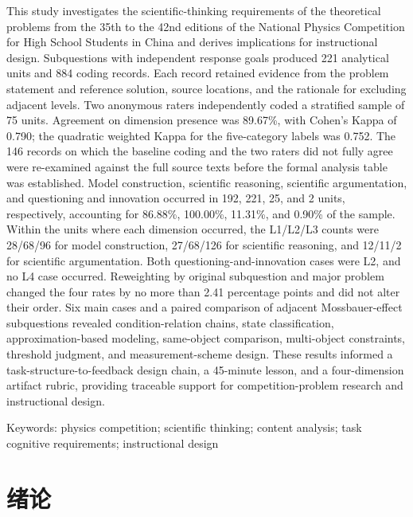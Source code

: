 \documentclass[
  12pt,
  a4paper,twoside,openany]{ctexbook}
\begin{document}
This study investigates the scientific-thinking requirements of the
theoretical problems from the 35th to the 42nd editions of the National
Physics Competition for High School Students in China and derives
implications for instructional design. Subquestions with independent
response goals produced 221 analytical units and 884 coding records.
Each record retained evidence from the problem statement and reference
solution, source locations, and the rationale for excluding adjacent
levels. Two anonymous raters independently coded a stratified sample of
75 units. Agreement on dimension presence was 89.67\%, with Cohen's
Kappa of 0.790; the quadratic weighted Kappa for the five-category
labels was 0.752. The 146 records on which the baseline coding and the
two raters did not fully agree were re-examined against the full source texts before the formal
analysis table was established. Model construction, scientific
reasoning, scientific argumentation, and questioning and innovation
occurred in 192, 221, 25, and 2 units, respectively, accounting for
86.88\%, 100.00\%, 11.31\%, and 0.90\% of the sample. Within the units
where each dimension occurred, the L1/L2/L3 counts were 28/68/96 for
model construction, 27/68/126 for scientific reasoning, and 12/11/2
for scientific argumentation. Both questioning-and-innovation cases
were L2, and no L4 case occurred. Reweighting by original subquestion
and major problem changed the four rates by no more than 2.41
percentage points and did not alter their order. Six main cases and a
paired comparison of adjacent Mossbauer-effect subquestions revealed
condition-relation chains, state classification, approximation-based
modeling, same-object comparison, multi-object constraints, threshold
judgment, and measurement-scheme design. These results informed a
task-structure-to-feedback design chain, a 45-minute lesson, and a
four-dimension artifact rubric, providing traceable support for
competition-problem research and instructional design.

Keywords: physics competition; scientific thinking; content analysis;
task cognitive requirements; instructional design

\endgroup
\clearpage
\setcounter{tocdepth}{2}
\tableofcontents
\clearpage
{}
{}
\listoffigures
\clearpage
{}
{}
\listoftables
\mainmatter
{}

\chapter{绪论}\label{ux7eeaux8bba}
\end{document}
